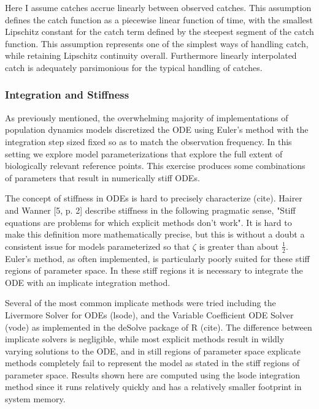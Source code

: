 \documentclass[12pt]{article}
\begin{document}
{%
Here I assume catches accrue linearly between observed catches. This assumption
defines the catch function as a piecewise linear function of time, with the
smallest Lipschitz constant for the catch term defined by the steepest segment
of the catch function. This assumption represents one of the simplest ways of
handling catch, while retaining Lipschitz continuity overall. Furthermore linearly
interpolated catch is adequately parsimonious for the typical handling of catches.

%
\subsubsection{Integration and Stiffness}

%
As previously mentioned, the overwhelming majority of implementations of
population dynamics models discretized the ODE using Euler's method with the
integration step sized fixed so as to match the observation frequency. In this
setting we explore model parameterizations that explore the full extent of
biologically relevant reference points. This exercise produces some
combinations of parameters that result in numerically stiff ODEs.

%
The concept of stiffness in ODEs is hard to precisely characterize
({\color{red}cite}). Hairer and Wanner [5, p. 2] describe stiffness in the
following pragmatic sense, "Stiff equations are problems for which explicit
methods don't work". It is hard to make this definition more mathematically
precise, but this is without a doubt a consistent issue for models parameterized
so that $\zeta$ is greater than about $\frac{1}{2}$. Euler's method, as often
implemented, is particularly poorly suited for these stiff regions of parameter
space. In these stiff regions it is necessary to integrate the ODE with an
implicate integration method.

%
Several of the most common implicate methods were tried including the
Livermore Solver for ODEs (lsode), and the Variable Coefficient ODE Solver
(vode) as implemented in the deSolve package of R ({\color{red}cite}). The
difference between implicate solvers is negligible, while most explicit
methods result in wildly varying solutions to the ODE, and in still regions of
parameter space explicate methods completely fail to represent the model as
stated in the stiff regions of parameter space. Results shown here are computed
using the lsode integration method since it runs relatively quickly and has a
relatively smaller footprint in system memory.


}
\end{document}
